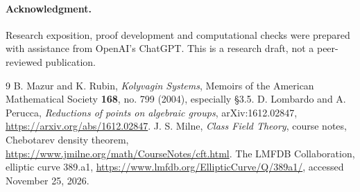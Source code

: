 \documentclass[11pt]{article}
\theoremstyle{remark}\newtheorem{remark}[theorem]{Remark}
\begin{document}
\paragraph{Acknowledgment.} Research exposition, proof development and computational checks were prepared with assistance from OpenAI's ChatGPT. This is a research draft, not a peer-reviewed publication.
\begin{thebibliography}{9}
 B. Mazur and K. Rubin, \emph{Kolyvagin Systems}, Memoirs of the American Mathematical Society \textbf{168}, no. 799 (2004), especially \S3.5.
 D. Lombardo and A. Perucca, \emph{Reductions of points on algebraic groups}, arXiv:1612.02847, \url{https://arxiv.org/abs/1612.02847}.
 J. S. Milne, \emph{Class Field Theory}, course notes, Chebotarev density theorem, \url{https://www.jmilne.org/math/CourseNotes/cft.html}.
 The LMFDB Collaboration, elliptic curve 389.a1, \url{https://www.lmfdb.org/EllipticCurve/Q/389a1/}, accessed November 25, 2026.
\end{thebibliography}
\end{document}
